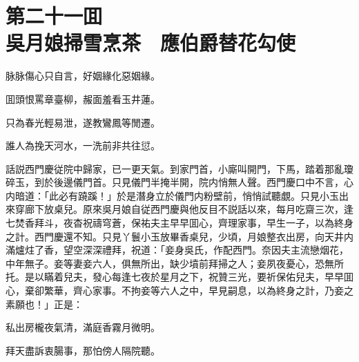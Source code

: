 
\chapter*{第二十一囬　\\吳月娘掃雪烹茶　應伯爵替花勾使}


\begin{myquote}
脉脉傷心只自言，好姻緣化惡姻緣。

囬頭恨罵章臺柳，赧面羞看玉井蓮。

只為春光輕易泄，遂教鸞鳳等閒遷。

誰人為挽天河水，一洗前非共往愆。
\end{myquote}

話説西門慶従院中歸家，已一更天氣。到家門首，小廝叫開門，下馬，踏着那亂瓊碎玉，到於後邊儀門首。只見儀門半掩半開，院内悄無人聲。西門慶口中不言，心内暗道：「此必有蹺蹊！」於是潛身立於儀門内粉壁前，悄悄試聽覷。只見小玉出來穿廊下放桌兒。原來吳月娘自従西門慶與他反目不説話以來，每月吃齋三次，逢七焚香拜斗，夜杳祝禱穹蒼，保祐夫主早早囬心，齊理家事，早生一子，以為終身之計。西門慶還不知。只見丫鬟小玉放畢香桌兒，少頃，月娘整衣出房，向天井内滿爐炷了香，望空深深禮拜，祝道：「妾身吳氏，作配西門。奈因夫主流戀烟花，中年無子。妾等妻妾六人，俱無所出，缺少墳前拜掃之人；妾夙夜憂心，恐無所托。是以瞞着兒夫，發心每逢七夜於星月之下，祝贊三光，要祈保佑兒夫，早早囬心，棄卻繁華，齊心家事。不拘妾等六人之中，早見嗣息，以為終身之計，乃妾之素願也！」正是：

\begin{myquote}
私出房櫳夜氣清，滿庭香霧月微明。

拜天盡訴衷腸事，那怕傍人隔院聽。
\end{myquote}

